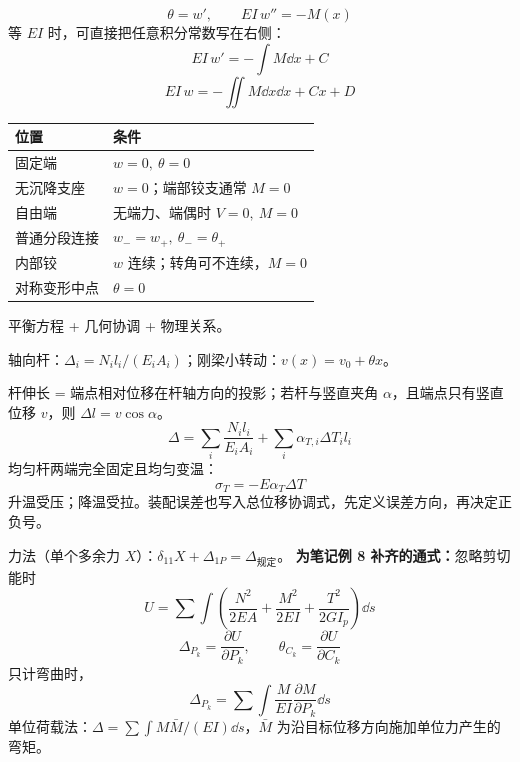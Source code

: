 \documentclass[a4paper,10pt,fontset=none]{ctexart}
\begin{document}
\begin{rightcol}
\[
\boxed{\theta=w',\qquad EI\,w''=-M(x)}
\]
等 $EI$ 时，可直接把任意积分常数写在右侧：
\[
EI\,w'=-\int M\dd x+C
\]
\[
EI\,w=-\iint M\dd x\dd x+Cx+D
\]
\par\begin{tabularx}{\linewidth}{@{}lX@{}}
\toprule
位置 & 条件\\\midrule
固定端 & $w=0,\ \theta=0$\\
无沉降支座 & $w=0$；端部铰支通常 $M=0$\\
自由端 & 无端力、端偶时 $V=0,\ M=0$\\
普通分段连接 & $w_-=w_+,\ \theta_-=\theta_+$\\
内部铰 & $w$ 连续；转角可不连续，$M=0$\\
对称变形中点 & $\theta=0$\\
\bottomrule
\end{tabularx}\par
{}
\begin{answerbox}
平衡方程 + 几何协调 + 物理关系。
\end{answerbox}
轴向杆：$\Delta_i=N_i l_i/(E_iA_i)$；刚梁小转动：$v(x)=v_0+\theta x$。

杆伸长 = 端点相对位移在杆轴方向的投影；若杆与竖直夹角 $\alpha$，且端点只有竖直位移 $v$，则 $\Delta l=v\cos\alpha$。
\[
\Delta=\sum_i\frac{N_i l_i}{E_iA_i}
+\sum_i\alpha_{T,i}\Delta T_i l_i
\]
均匀杆两端完全固定且均匀变温：
\[
\boxed{\sigma_T=-E\alpha_T\Delta T}
\]
升温受压；降温受拉。装配误差也写入总位移协调式，先定义误差方向，再决定正负号。

力法（单个多余力 $X$）：$\delta_{11}X+\Delta_{1P}=\Delta_{\text{规定}}$。
\textbf{为笔记例 8 补齐的通式：}忽略剪切能时
\[
U=\sum\int\left(\frac{N^2}{2EA}+\frac{M^2}{2EI}+\frac{T^2}{2GI_p}\right)\dd s
\]
\[
\boxed{\Delta_{P_k}=\frac{\partial U}{\partial P_k}},\qquad
\theta_{C_k}=\frac{\partial U}{\partial C_k}
\]
只计弯曲时，
\[
\Delta_{P_k}=\sum\int\frac{M}{EI}\frac{\partial M}{\partial P_k}\dd s
\]
单位荷载法：$\Delta=\sum\int M\bar M/(EI)\dd s$，$\bar M$ 为沿目标位移方向施加单位力产生的弯矩。
\end{rightcol}
\end{document}
